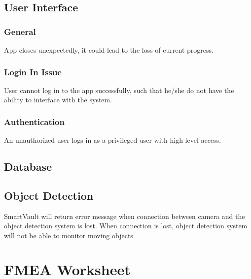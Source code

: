 \documentclass{article}
\begin{document}
\subsection{User Interface}
\subsubsection{General}
App closes unexpectedly, it could lead to the loss of current progress.
\subsubsection{Login In Issue}
User cannot log in to the app successfully, such that he/she do not have the ability to interface with the system.
\subsubsection{Authentication}
An unauthorized user logs in as a privileged user with high-level access.
\subsection{Database}
\subsection{Object Detection}
SmartVault will return error message when connection between camera and the object detection system is lost. When connection is lost, object detection system will not be able to monitor moving objects.


\section{FMEA Worksheet}
\end{document}
